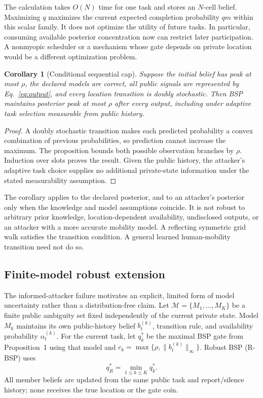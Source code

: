 \documentclass[review,11pt,times]{elsarticle}
\newtheorem{corollary}{Corollary}
\begin{document}
The calculation takes $O(N)$ time for one task and stores an $N$-cell belief. Maximizing $q$ maximizes the current expected completion probability $qm$ within this scalar family. It does not optimize the utility of future tasks. In particular, consuming available posterior concentration now can restrict later participation. A nonmyopic scheduler or a mechanism whose gate depends on private location would be a different optimization problem.

\begin{corollary}[Conditional sequential cap]
Suppose the initial belief has peak at most $\rho$, the declared models are correct, all public signals are represented by Eq.~\eqref{eq:output}, and every location transition is doubly stochastic. Then BSP maintains posterior peak at most $\rho$ after every output, including under adaptive task selection measurable from public history.
\end{corollary}
\begin{proof}
A doubly stochastic transition makes each predicted probability a convex combination of previous probabilities, so prediction cannot increase the maximum. The proposition bounds both possible observation branches by $\rho$. Induction over slots proves the result. Given the public history, the attacker's adaptive task choice supplies no additional private-state information under the stated measurability assumption.
\end{proof}

The corollary applies to the declared posterior, and to an attacker's posterior only when the knowledge and model assumptions coincide. It is not robust to arbitrary prior knowledge, location-dependent availability, undisclosed outputs, or an attacker with a more accurate mobility model. A reflecting symmetric grid walk satisfies the transition condition. A general learned human-mobility transition need not do so.

\subsection{Finite-model robust extension}
\label{sec:robust}
The informed-attacker failure motivates an explicit, limited form of model uncertainty rather than a distribution-free claim. Let $\mathcal M=\{M_1,\ldots,M_K\}$ be a finite public ambiguity set fixed independently of the current private state. Model $M_k$ maintains its own public-history belief $b_t^{(k)}$, transition rule, and availability probability $\alpha_t^{(k)}$. For the current task, let $q_k^*$ be the maximal BSP gate from Proposition~1 using that model and $c_k=\max\{\rho,\|b_t^{(k)}\|_\infty\}$. Robust BSP (R-BSP) uses
\begin{equation}
 q_R^*=\min_{1\le k\le K} q_k^*.
 \label{eq:robust-gate}
\end{equation}
All member beliefs are updated from the same public task and report/silence history; none receives the true location or the gate coin.
\end{document}

